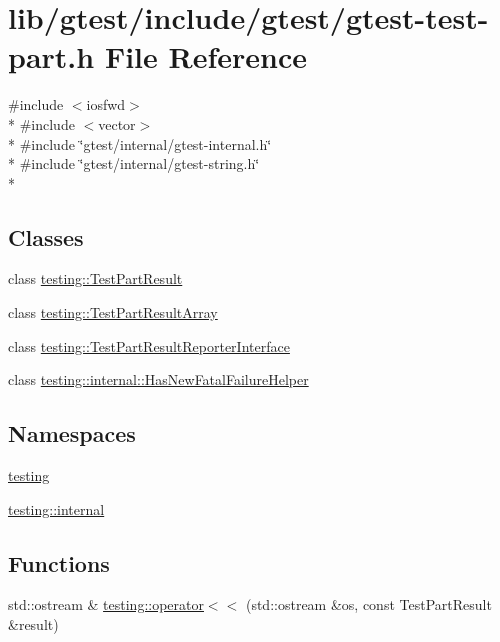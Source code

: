 \hypertarget{gtest-test-part_8h}{\section{lib/gtest/include/gtest/gtest-\/test-\/part.h File Reference}
\label{gtest-test-part_8h}
}
{\ttfamily \#include $<$iosfwd$>$}\\*
{\ttfamily \#include $<$vector$>$}\\*
{\ttfamily \#include \char`\"{}gtest/internal/gtest-\/internal.\-h\char`\"{}}\\*
{\ttfamily \#include \char`\"{}gtest/internal/gtest-\/string.\-h\char`\"{}}\\*
\subsection*{Classes}
\begin{DoxyCompactItemize}
\item 
class \hyperlink{classtesting_1_1_test_part_result}{testing\-::\-Test\-Part\-Result}
\item 
class \hyperlink{classtesting_1_1_test_part_result_array}{testing\-::\-Test\-Part\-Result\-Array}
\item 
class \hyperlink{classtesting_1_1_test_part_result_reporter_interface}{testing\-::\-Test\-Part\-Result\-Reporter\-Interface}
\item 
class \hyperlink{classtesting_1_1internal_1_1_has_new_fatal_failure_helper}{testing\-::internal\-::\-Has\-New\-Fatal\-Failure\-Helper}
\end{DoxyCompactItemize}
\subsection*{Namespaces}
\begin{DoxyCompactItemize}
\item 
\hyperlink{namespacetesting}{testing}
\item 
\hyperlink{namespacetesting_1_1internal}{testing\-::internal}
\end{DoxyCompactItemize}
\subsection*{Functions}
\begin{DoxyCompactItemize}
\item 
std\-::ostream \& \hyperlink{namespacetesting_a7c88897836b9f492190fb2b9dfa3a327}{testing\-::operator$<$$<$} (std\-::ostream \&os, const Test\-Part\-Result \&result)
\end{DoxyCompactItemize}
